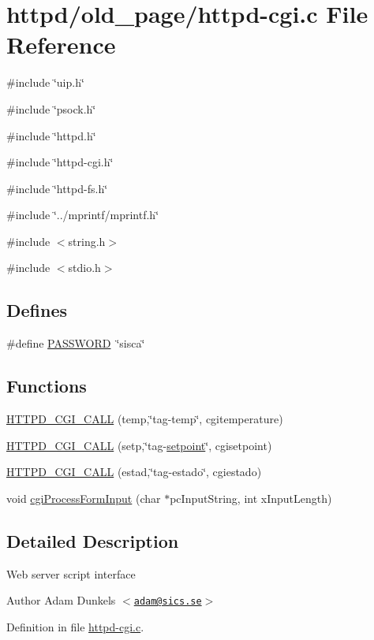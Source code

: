 \hypertarget{old__page_2httpd-cgi_8c}{
\section{httpd/old\_\-page/httpd-\/cgi.c File Reference}
\label{old__page_2httpd-cgi_8c}
}
{\ttfamily \#include \char`\"{}uip.h\char`\"{}}\par
{\ttfamily \#include \char`\"{}psock.h\char`\"{}}\par
{\ttfamily \#include \char`\"{}httpd.h\char`\"{}}\par
{\ttfamily \#include \char`\"{}httpd-\/cgi.h\char`\"{}}\par
{\ttfamily \#include \char`\"{}httpd-\/fs.h\char`\"{}}\par
{\ttfamily \#include \char`\"{}../mprintf/mprintf.h\char`\"{}}\par
{\ttfamily \#include $<$string.h$>$}\par
{\ttfamily \#include $<$stdio.h$>$}\par
\subsection*{Defines}
\begin{DoxyCompactItemize}
\item 
\#define \hyperlink{group__httpd_ga9e8538fad4eee548302ad9f60e6d47ca}{PASSWORD}~\char`\"{}sisca\char`\"{}
\end{DoxyCompactItemize}
\subsection*{Functions}
\begin{DoxyCompactItemize}
\item 
\hyperlink{group__httpd_ga8eddae8a1ebb30e99fa532c24b9636e2}{HTTPD\_\-CGI\_\-CALL} (temp,\char`\"{}tag-\/temp\char`\"{}, cgitemperature)
\item 
\hyperlink{group__httpd_gaf26fd024a7c14362e8d2ae1cb9313826}{HTTPD\_\-CGI\_\-CALL} (setp,\char`\"{}tag-\/\hyperlink{main_8c_a6c40a119d8159c4afa4ac8c0e77faf68}{setpoint}\char`\"{}, cgisetpoint)
\item 
\hyperlink{group__httpd_gaadf89127edf1b661331480736fc38643}{HTTPD\_\-CGI\_\-CALL} (estad,\char`\"{}tag-\/estado\char`\"{}, cgiestado)
\item 
void \hyperlink{group__httpd_ga4f9b39d727880fedab8fe2e4e2aafbf3}{cgiProcessFormInput} (char $\ast$pcInputString, int xInputLength)
\end{DoxyCompactItemize}


\subsection{Detailed Description}
Web server script interface \begin{DoxyAuthor}{Author}
Adam Dunkels $<$\href{mailto:adam@sics.se}{\tt adam@sics.se}$>$ 
\end{DoxyAuthor}


Definition in file \hyperlink{old__page_2httpd-cgi_8c_source}{httpd-\/cgi.c}.

